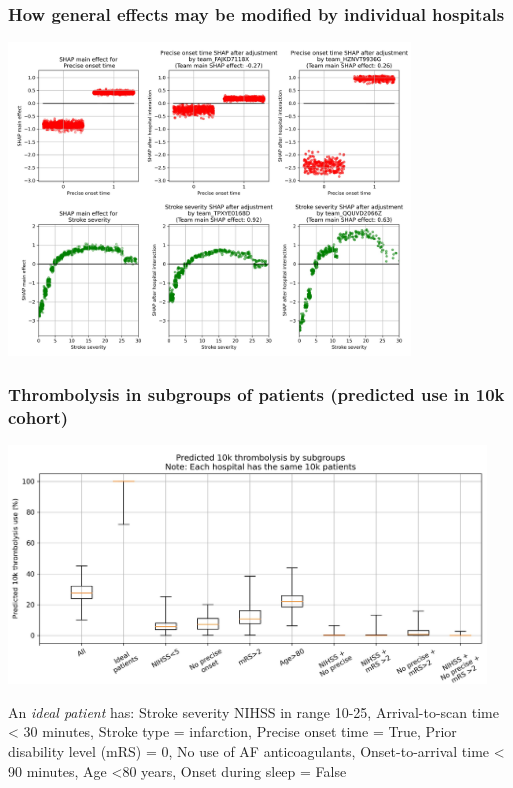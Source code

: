 \documentclass{beamer}
\begin{document}

\begin{frame}
\frametitle{How general effects may be modified by individual hospitals}

\begin{center}
\includegraphics[width=0.80\textwidth]{./images/12aa_two_way_shap_adjustment.jpg}
\end{center}
\end{frame}


\begin{frame}
\frametitle{Thrombolysis in subgroups of patients (predicted use in 10k cohort)}

\begin{center}
\includegraphics[width=0.95\textwidth]{./images/15c_modelled_subgroup_violin.jpg}
\end{center}

\scriptsize An \emph{ideal patient} has: Stroke severity NIHSS in range 10-25, Arrival-to-scan time \textless{} 30 minutes, Stroke type = infarction, Precise onset time = True, Prior disability level (mRS) = 0, No use of AF anticoagulants, Onset-to-arrival time \textless{} 90 minutes, Age \textless{}80 years, Onset during sleep = False
\end{frame}
\end{document}
